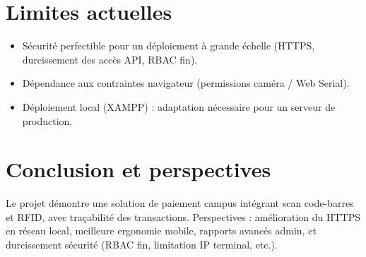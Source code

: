\documentclass[12pt,a4paper]{report}
\begin{document}
\section{Limites actuelles}
\begin{itemize}
  \item Sécurité perfectible pour un déploiement à grande échelle (HTTPS, durcissement des accès API, RBAC fin).
  \item Dépendance aux contraintes navigateur (permissions caméra / Web Serial).
  \item Déploiement local (XAMPP) : adaptation nécessaire pour un serveur de production.
\end{itemize}

\section{Conclusion et perspectives}
Le projet démontre une solution de paiement campus intégrant scan code-barres et RFID, avec traçabilité des transactions. Perspectives : amélioration du HTTPS en réseau local, meilleure ergonomie mobile, rapports avancés admin, et durcissement sécurité (RBAC fin, limitation IP terminal, etc.).
\end{document}
